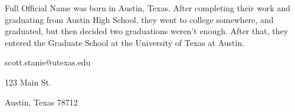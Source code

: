 \documentclass{utexasthesis}
\begin{document}
%
%	
%	
%		
%
%
%
%	
%	
%
%



\makeappendix

 
% 


\begin{vita}
  Full Official Name was born in Austin, Texas. After completing their work and graduating from Austin High School, they went to college somewhere, and graduated, but then decided two graduations weren't enough.
  After that, they entered the Graduate School at the University of Texas at Austin.

  \begin{address}
    scott.stanie@utexas.edu

    123 Main St.

    Austin, Texas 78712
  \end{address}

\end{vita}
\end{document}
